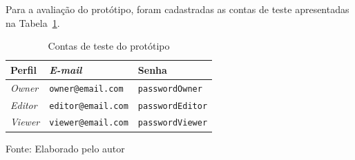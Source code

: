 Para a avaliação do protótipo, foram cadastradas as contas de teste apresentadas na Tabela~\ref{tab:usuarios-teste}.

\begin{table}[H]
\centering
\renewcommand{\arraystretch}{1.4}
\caption{Contas de teste do protótipo}
\label{tab:usuarios-teste}
    \begin{tabular}{|l|l|l|}
    \hline
    \textbf{Perfil} & \textbf{\textit{E-mail}} & \textbf{Senha} \\
    \hline
    \textit{Owner}  & \texttt{owner@email.com}  & \texttt{passwordOwner}  \\
    \hline
    \textit{Editor} & \texttt{editor@email.com} & \texttt{passwordEditor} \\
    \hline
    \textit{Viewer} & \texttt{viewer@email.com} & \texttt{passwordViewer} \\
    \hline
    \end{tabular}
\begin{center}
    {\small Fonte: Elaborado pelo autor}
\end{center}
\end{table}
